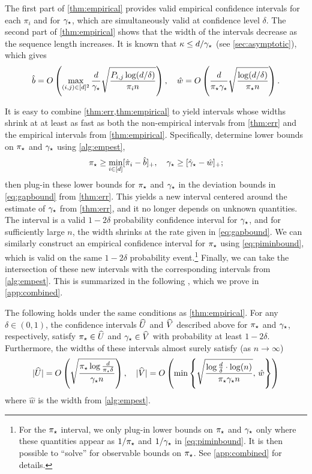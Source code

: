 The first part of \cref{thm:empirical} provides valid empirical
confidence intervals for each $\pi_i$ and for $\gamma_{\star}$, which are
simultaneously valid at confidence level $\delta$.
The second part of \cref{thm:empirical} shows that the width of the
intervals decrease as the sequence length increases.
It is known that $\kappa \le d/\gamma_{\star}$ (see \cref{sec:asymptotic}),
which gives
\[
  \hat{b}
  =
  O\left(
    \max_{(i,j) \in [d]^2}
    \frac{d}{\gamma_{\star}}
    \sqrt{\frac{P_{i,j}\log(d/\delta)}{\pi_i n}}
  \right)
  , \quad
  \hat{w}
  =
  O\left( 
    \frac{d}{\pi_{\star}\gamma_{\star}} \sqrt{\frac{\log(d/\delta)}{\pi_{\star} n}}
  \right)
  .
\] 

It is easy to combine \cref{thm:err,thm:empirical} to yield intervals
whose widths shrink at at least as fast as both the non-empirical
intervals from \cref{thm:err} and the empirical intervals from
\cref{thm:empirical}.
Specifically, determine lower bounds on $\pi_{\star}$ and $\gamma_{\star}$ using
\cref{alg:empest},
\[
  \pi_{\star} \geq \min_{i \in [d]} [ \hat\pi_i - \hat{b} ]_+
  , \quad
  \gamma_{\star} \geq [ \hat\gamma_{\star} - \hat{w} ]_+
  ;
\]
then plug-in these lower bounds for $\pi_{\star}$ and $\gamma_{\star}$ in the
deviation bounds in \cref{eq:gapbound} from \cref{thm:err}.
This yields a new interval centered around the estimate of $\gamma_{\star}$ from
\cref{thm:err}, and it no longer depends on unknown quantities.
The interval is a valid $1-2\delta$ probability confidence interval
for $\gamma_{\star}$, and for sufficiently large $n$, the width shrinks at the
rate given in \cref{eq:gapbound}.
We can similarly construct an empirical confidence interval for
$\pi_{\star}$ using \cref{eq:piminbound}, which is valid on the same
$1-2\delta$ probability event.\footnote{%
  For the $\pi_{\star}$ interval, we only plug-in lower bounds on $\pi_{\star}$
  and $\gamma_{\star}$ only where these quantities appear as $1/\pi_{\star}$ and
  $1/\gamma_{\star}$ in \cref{eq:piminbound}.
  It is then possible to ``solve'' for observable bounds on $\pi_{\star}$.
  See \cref{app:combined} for details.%
}
Finally, we can take the intersection of these new intervals with the
corresponding intervals from \cref{alg:empest}.
This is summarized in the following , which
we prove in \cref{app:combined}.
\begin{theorem}
  \label{thm:combined}
  The following holds under the same conditions as
  \cref{thm:empirical}.
  For any $\delta \in (0,1)$, the confidence intervals $\widehat{U}$ and
  $\widehat{V}$ described above for $\pi_{\star}$ and $\gamma_{\star}$, respectively,
  satisfy $\pi_{\star} \in \widehat{U}$ and $\gamma_{\star} \in \widehat{V}$ with probability
  at least $1-2\delta$.
  Furthermore, the widths of these intervals almost surely satisfy
  (as $n \to \infty$) 
  \[
    |\widehat{U}|
    =
    O\left(
      \sqrt{\frac{\pi_{\star}\log\frac{d}{\pi_{\star}\delta}}{\gamma_{\star} n}}
    \right)
    ,
    \quad
    |\widehat{V}|
    =
    O\left(
      \min\left\{
        \sqrt{\frac{\log\frac{d}{\delta}\cdot\log(n)}{\pi_{\star}\gamma_{\star} n}}
        ,\,
        \hat{w}
      \right\}
    \right)
  \]
  where $\hat{w}$ is the width from \cref{alg:empest}.
\end{theorem}

